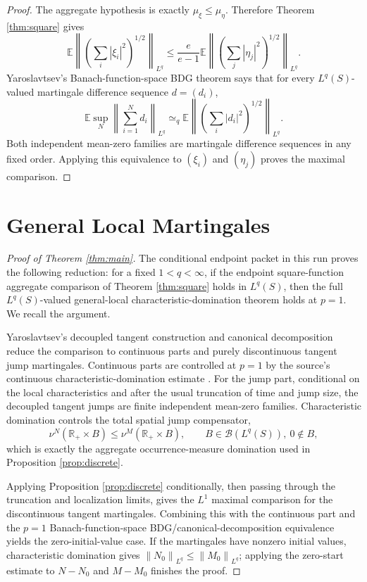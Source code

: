 \documentclass[11pt]{article}
\newcommand{\E}{\mathbb E}
\newcommand{\R}{\mathbb R}
\newcommand{\cB}{\mathcal B}
\newcommand{\norm}[1]{\left\lVert #1\right\rVert}
\begin{document}
\begin{proof}
The aggregate hypothesis is exactly \(\mu_\xi\le\mu_\eta\).  Therefore
Theorem \ref{thm:square} gives
\[
  \E\left\|\left(\sum_i|\xi_i|^2\right)^{1/2}\right\|_{L^q}
  \le
  \frac{e}{e-1}
  \E\left\|\left(\sum_j|\eta_j|^2\right)^{1/2}\right\|_{L^q}.
\]
Yaroslavtsev's Banach-function-space BDG theorem
\cite[Theorem 4.32 and Proposition 4.33]{Yaroslavtsev2018} says that for
every \(L^q(S)\)-valued martingale difference sequence \(d=(d_i)\),
\[
  \E\sup_N\left\|\sum_{i=1}^N d_i\right\|_{L^q}
  \simeq_q
  \E\left\|
      \left(\sum_i |d_i|^2\right)^{1/2}
    \right\|_{L^q}.
\]
Both independent mean-zero families are martingale difference sequences in
any fixed order.  Applying this equivalence to \((\xi_i)\) and \((\eta_j)\)
proves the maximal comparison.
\end{proof}

\section*{General Local Martingales}

\begin{proof}[Proof of Theorem \ref{thm:main}]
The conditional endpoint packet in this run proves the following reduction:
for a fixed \(1<q<\infty\), if the endpoint square-function aggregate
comparison of Theorem \ref{thm:square} holds in \(L^q(S)\), then the full
\(L^q(S)\)-valued general-local characteristic-domination theorem holds at
\(p=1\).  We recall the argument.

Yaroslavtsev's decoupled tangent construction and canonical decomposition
reduce the comparison to continuous parts and purely discontinuous tangent
jump martingales.  Continuous parts are controlled at \(p=1\) by the source's
continuous characteristic-domination estimate \cite[Proposition 12.6]{Yaroslavtsev2019}.
For the jump part, conditional on the local characteristics and after the
usual truncation of time and jump size, the decoupled tangent jumps are finite
independent mean-zero families.  Characteristic domination controls the total
spatial jump compensator,
\[
  \nu^N(\R_+\times B)\le \nu^M(\R_+\times B),
  \qquad B\in\cB(L^q(S)),\ 0\notin B,
\]
which is exactly the aggregate occurrence-measure domination used in
Proposition \ref{prop:discrete}.

Applying Proposition \ref{prop:discrete} conditionally, then passing through
the truncation and localization limits, gives the \(L^1\) maximal comparison
for the discontinuous tangent martingales.  Combining this with the continuous
part and the \(p=1\) Banach-function-space BDG/canonical-decomposition
equivalence \cite[Section 4.3]{Yaroslavtsev2018} yields the zero-initial-value
case.  If the martingales have nonzero initial values, characteristic
domination gives \(\norm{N_0}_{L^q}\le\norm{M_0}_{L^q}\); applying the
zero-start estimate to \(N-N_0\) and \(M-M_0\) finishes the proof.
\end{proof}
\end{document}
